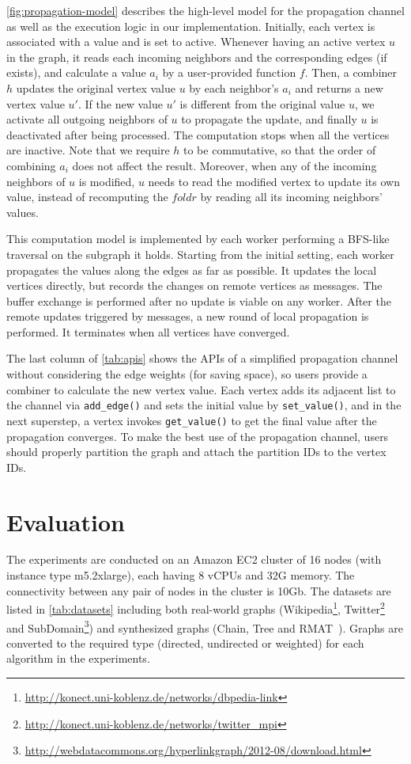 \documentclass{sokendai_thesis} %
\begin{document}
\autoref{fig:propagation-model} describes the high-level model for the propagation channel as well as the execution logic in our implementation.
Initially, each vertex is associated with a value and is set to active.
Whenever having an active vertex $u$ in the graph, it reads each incoming neighbors and the corresponding edges (if exists), and calculate a value $a_i$ by a user-provided function $f$.
Then, a combiner $h$ updates the original vertex value $u$ by each neighbor's $a_i$ and returns a new vertex value $u'$.
If the new value $u'$ is different from the original value $u$, we activate all outgoing neighbors of $u$ to propagate the update, and finally $u$ is deactivated after being processed.
The computation stops when all the vertices are inactive.
Note that we require $h$ to be commutative, so that the order of combining $a_i$ does not affect the result.
Moreover, when any of the incoming neighbors of $u$ is modified, $u$ needs to read the modified vertex to update its own value, instead of recomputing the $\mathit{foldr}$ by reading all its incoming neighbors' values.

This computation model is implemented by each worker performing a BFS-like traversal on the subgraph it holds.
Starting from the initial setting, each worker propagates the values along the edges as far as possible.
It updates the local vertices directly, but records the changes on remote vertices as messages.
The buffer exchange is performed after no update is viable on any worker.
After the remote updates triggered by messages, a new round of local propagation is performed.
It terminates when all vertices have converged.

The last column of \autoref{tab:apis} shows the APIs of a simplified propagation channel without considering the edge weights (for saving space), so users provide a combiner to calculate the new vertex value.
Each vertex adds its adjacent list to the channel via \texttt{add\_edge()} and sets the initial value by \texttt{set\_value()}, and in the next superstep, a vertex invokes \texttt{get\_value()} to get the final value after the propagation converges.
To make the best use of the propagation channel, users should properly partition the graph and attach the partition IDs to the vertex IDs.

\section{Evaluation}
\label{sec:vcgp-eval}

The experiments are conducted on an Amazon EC2 cluster of 16 nodes (with instance type m5.2xlarge), each having 8 vCPUs and 32G memory.
The connectivity between any pair of nodes in the cluster is 10Gb.
The datasets are listed in \autoref{tab:datasets} including both real-world graphs (Wikipedia\footnote{\small\url{http://konect.uni-koblenz.de/networks/dbpedia-link}}, Twitter\footnote{\small\url{http://konect.uni-koblenz.de/networks/twitter_mpi}} and SubDomain\footnote{\small\url{http://webdatacommons.org/hyperlinkgraph/2012-08/download.html}}) and synthesized graphs (Chain, Tree and RMAT~\cite{rmat}).
Graphs are converted to the required type (directed, undirected or weighted) for each algorithm in the experiments.
\end{document}
